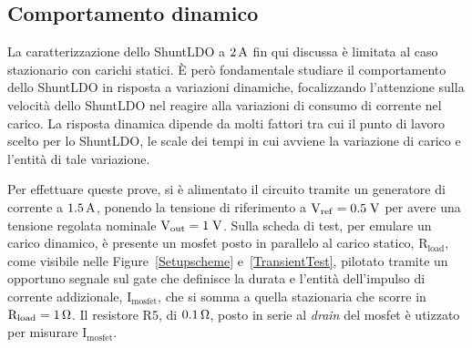\subsection{Comportamento dinamico}

La caratterizzazione dello ShuntLDO a $2 \rm \, A$ fin qui discussa \`e limitata al caso stazionario con carichi statici.
\`E per\`o fondamentale studiare il comportamento dello ShuntLDO in risposta a variazioni dinamiche, focalizzando l'attenzione sulla velocità dello ShuntLDO nel reagire alla variazioni di consumo di corrente nel carico. 
La risposta dinamica dipende da molti fattori tra cui il punto di lavoro scelto per lo ShuntLDO, le scale dei tempi in cui avviene la variazione di carico e l'entità di tale variazione.

Per effettuare queste prove, si è alimentato il circuito tramite un generatore di corrente a $1.5\rm \, A$, ponendo la tensione di riferimento a $\mathrm{V_{ref}=0.5 \rm \; V}$ per avere una tensione regolata nominale $\mathrm{V_{out}}=1\rm \; V$. %
Sulla scheda di test, per emulare un carico dinamico, è presente un mosfet posto in parallelo al carico statico, $\mathrm{R_{load}}$, come visibile nelle Figure~\ref{Setupscheme} e~\ref{TransientTest}, pilotato tramite un opportuno segnale sul gate che definisce la durata e l'entit\`a dell'impulso di corrente addizionale, $\mathrm{I_{mosfet}}$, che si somma a quella stazionaria che scorre in $\mathrm{R_{load}= 1 {\rm \, \Omega}}$. Il resistore R5, di $0.1 {\rm \, \Omega}$, posto in serie al \textit{drain} del mosfet \`e utizzato per misurare $\mathrm{I_{mosfet}}$.

